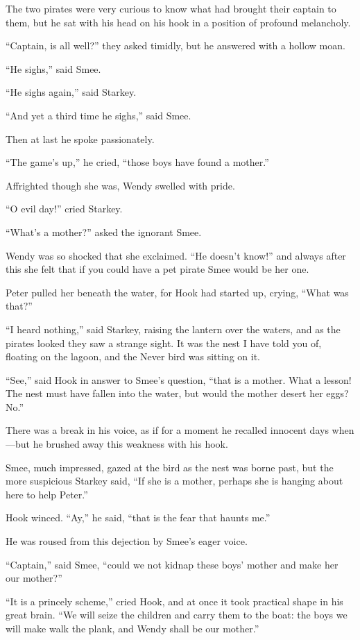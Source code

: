 The two pirates were very curious to know what had brought their
captain to them, but he sat with his head on his hook in a position of
profound melancholy.

``Captain, is all well?'' they asked timidly, but he answered with a
hollow moan.

``He sighs,'' said Smee.

``He sighs again,'' said Starkey.

``And yet a third time he sighs,'' said Smee.

Then at last he spoke passionately.

``The game's up,'' he cried, ``those boys have found a mother.''

Affrighted though she was, Wendy swelled with pride.

``O evil day!'' cried Starkey.

``What's a mother?'' asked the ignorant Smee.

Wendy was so shocked that she exclaimed. ``He doesn't know!'' and always
after this she felt that if you could have a pet pirate Smee would be
her one.

Peter pulled her beneath the water, for Hook had started up, crying,
``What was that?''

``I heard nothing,'' said Starkey, raising the lantern over the waters,
and as the pirates looked they saw a strange sight. It was the nest I
have told you of, floating on the lagoon, and the Never bird was
sitting on it.

``See,'' said Hook in answer to Smee's question, ``that is a mother. What
a lesson! The nest must have fallen into the water, but would the
mother desert her eggs? No.''

There was a break in his voice, as if for a moment he recalled innocent
days when—but he brushed away this weakness with his hook.

Smee, much impressed, gazed at the bird as the nest was borne past, but
the more suspicious Starkey said, ``If she is a mother, perhaps she is
hanging about here to help Peter.''

Hook winced. ``Ay,'' he said, ``that is the fear that haunts me.''

He was roused from this dejection by Smee's eager voice.

``Captain,'' said Smee, ``could we not kidnap these boys' mother and make
her our mother?''

``It is a princely scheme,'' cried Hook, and at once it took practical
shape in his great brain. ``We will seize the children and carry them to
the boat: the boys we will make walk the plank, and Wendy shall be our
mother.''

